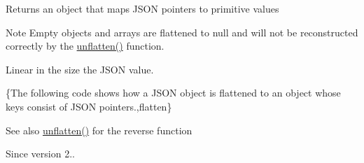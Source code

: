 \begin{DoxyReturn}{Returns}
an object that maps J\+S\+ON pointers to primitive values
\end{DoxyReturn}
\begin{DoxyNote}{Note}
Empty objects and arrays are flattened to {\ttfamily null} and will not be reconstructed correctly by the \hyperlink{classnlohmann_1_1basic__json_a8276b7a575ab680644d4de047d08505c}{unflatten()} function.
\end{DoxyNote}
Linear in the size the J\+S\+ON value.

\{The following code shows how a J\+S\+ON object is flattened to an object whose keys consist of J\+S\+ON pointers.,flatten\}

\begin{DoxySeeAlso}{See also}
\hyperlink{classnlohmann_1_1basic__json_a8276b7a575ab680644d4de047d08505c}{unflatten()} for the reverse function
\end{DoxySeeAlso}
\begin{DoxySince}{Since}
version 2.. 
\end{DoxySince}
